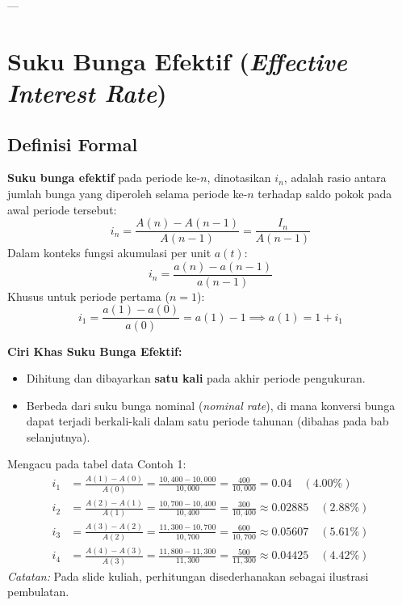 \documentclass[11pt,a4paper]{article}
\begin{document}
---

\section{Suku Bunga Efektif (\textit{Effective Interest Rate})}

\subsection{Definisi Formal}
\begin{definitionbox}
\textbf{Suku bunga efektif} pada periode ke-$n$, dinotasikan $i_n$, adalah rasio antara jumlah bunga yang diperoleh selama periode ke-$n$ terhadap saldo pokok pada awal periode tersebut:
\begin{equation}
    i_n = \frac{A(n) - A(n-1)}{A(n-1)} = \frac{I_n}{A(n-1)}
\end{equation}
Dalam konteks fungsi akumulasi per unit $a(t)$:
\begin{equation}
    i_n = \frac{a(n) - a(n-1)}{a(n-1)}
\end{equation}
Khusus untuk periode pertama ($n=1$):
\begin{equation}
    i_1 = \frac{a(1) - a(0)}{a(0)} = a(1) - 1 \implies a(1) = 1 + i_1
\end{equation}
\end{definitionbox}

\textbf{Ciri Khas Suku Bunga Efektif:}
\begin{itemize}
    \item Dihitung dan dibayarkan \textbf{satu kali} pada akhir periode pengukuran.
    \item Berbeda dari suku bunga nominal (\textit{nominal rate}), di mana konversi bunga dapat terjadi berkali-kali dalam satu periode tahunan (dibahas pada bab selanjutnya).
\end{itemize}

\begin{examplebox}
Mengacu pada tabel data Contoh 1:
\begin{align*}
    i_1 &= \frac{A(1) - A(0)}{A(0)} = \frac{10{,}400 - 10{,}000}{10{,}000} = \frac{400}{10{,}000} = 0.04 \quad (4.00\%) \\[0.5em]
    i_2 &= \frac{A(2) - A(1)}{A(1)} = \frac{10{,}700 - 10{,}400}{10{,}400} = \frac{300}{10{,}400} \approx 0.02885 \quad (2.88\%) \\[0.5em]
    i_3 &= \frac{A(3) - A(2)}{A(2)} = \frac{11{,}300 - 10{,}700}{10{,}700} = \frac{600}{10{,}700} \approx 0.05607 \quad (5.61\%) \\[0.5em]
    i_4 &= \frac{A(4) - A(3)}{A(3)} = \frac{11{,}800 - 11{,}300}{11{,}300} = \frac{500}{11{,}300} \approx 0.04425 \quad (4.42\%)
\end{align*}
\textit{Catatan:} Pada slide kuliah, perhitungan disederhanakan sebagai ilustrasi pembulatan.
\end{examplebox}
\end{document}
